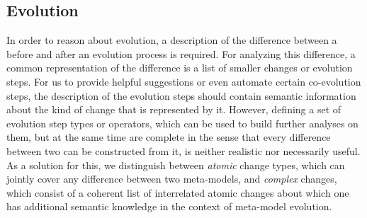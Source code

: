 \begin{comment}
The expected behavior of the model query operators in~\cref{fig:model-query-operators} is as follows.
The \texttt{select} operator selects \metamodel elements, which will appear in the view type, while the \texttt{filter} operator is used to define criteria by which model instances are included in a view when generating it.
\MA{So, if I understand correctly, a "select" is a "filter" with no filtering criterium?}
\LK{Not directly. Comparing it to databases, the "select" operator would create the column headers, i.e. specify what kind of data will be presented, while the "filter" operator would define (e.g., by defining a predicate function) which rows from the database will be included in the result. Is this understandable from what I wrote or do you have an idea how I could improve the explanation?}
For the multi-\metamodel case, the \texttt{join} operator connects model instances from different \metamodels.
Both, the \texttt{aggregate} and the \texttt{calculate} operator create new model elements.
While the former combines the values of a single property in multiple instances of a \metaclass, the latter is used to calculate a new property based on multiple existing ones.
Following \textcite{burger_model-join_2016}, we assume this is a reasonable set of operators for the definition of generic views.
\end{comment}

\subsection{\Metamodel Evolution}
\label{sec:MetaModelEvolution}

In order to reason about \metamodel evolution, a description of the difference between a \metamodel before and after an evolution process is required.
For analyzing this difference, a common representation of the difference is a list of smaller changes or evolution steps.
For us to provide helpful suggestions or even automate certain co-evolution steps, the description of the evolution steps should contain semantic information about the kind of change that is represented by it.
However, defining a set of evolution step types or operators, which can be used to build further analyses on them, but at the same time are complete in the sense that every difference between two \metamodels can be constructed from it, is neither realistic nor necessarily useful.
As a solution for this, we distinguish between \emph{atomic} \metamodel change 
types, which can jointly cover any difference between two meta-models, and 
\emph{complex} changes, which consist of a coherent list of interrelated atomic changes about which one has additional semantic knowledge in the context of meta-model evolution.


